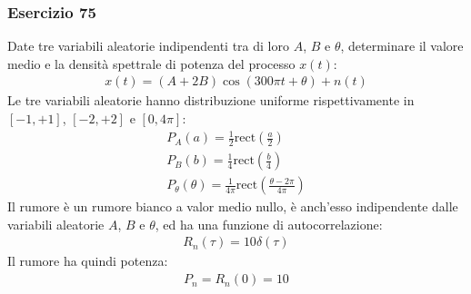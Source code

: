 \documentclass{article}
\newcommand{\rect}{\mathrm{rect}}
\begin{document}
\subsubsection*{Esercizio 75}

Date tre variabili aleatorie indipendenti tra di loro $A$, $B$ e $\theta$, determinare il valore medio e la densità spettrale di potenza del processo $x(t)$:
\begin{gather*}
    x(t)=(A+2B)\cos(300\pi t+\theta)+n(t)
\end{gather*}
Le tre variabili aleatorie hanno distribuzione uniforme rispettivamente in $[-1,+1]$, $[-2,+2]$ e $[0,4\pi]$:
\begin{gather*}
    P_A(a)=\displaystyle\frac{1}{2}\rect\left(\frac{a}{2}\right)\\
    P_B(b)=\displaystyle\frac{1}{4}\rect\left(\frac{b}{4}\right)\\
    P_\theta(\theta)=\displaystyle\frac{1}{4\pi}\rect\left(\frac{\theta-2\pi}{4\pi}\right)
\end{gather*}
Il rumore è un rumore bianco a valor medio nullo, è anch'esso indipendente dalle variabili aleatorie $A$, $B$ e $\theta$, ed ha una funzione di autocorrelazione:
\begin{gather*}
    R_n(\tau)=10\delta(\tau)
\end{gather*}
Il rumore ha quindi potenza:
\begin{gather*}
    P_n=R_n(0)=10
\end{gather*}
\end{document}
